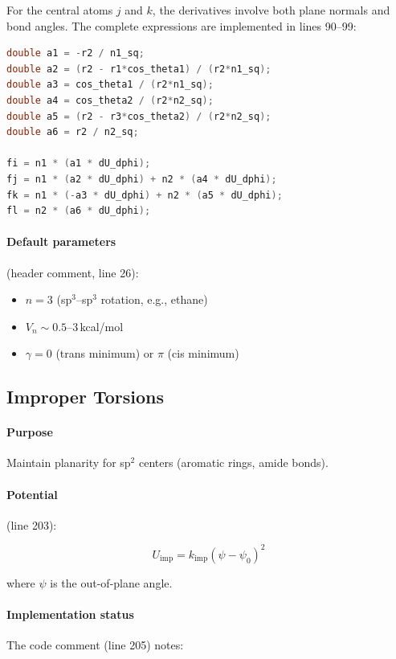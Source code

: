 \documentclass[11pt]{article}
\begin{document}
For the central atoms $j$ and $k$, the derivatives involve both plane normals and bond angles. The complete expressions are implemented in lines 90--99:

\begin{lstlisting}[language=C++]
double a1 = -r2 / n1_sq;
double a2 = (r2 - r1*cos_theta1) / (r2*n1_sq);
double a3 = cos_theta1 / (r2*n1_sq);
double a4 = cos_theta2 / (r2*n2_sq);
double a5 = (r2 - r3*cos_theta2) / (r2*n2_sq);
double a6 = r2 / n2_sq;

fi = n1 * (a1 * dU_dphi);
fj = n1 * (a2 * dU_dphi) + n2 * (a4 * dU_dphi);
fk = n1 * (-a3 * dU_dphi) + n2 * (a5 * dU_dphi);
fl = n2 * (a6 * dU_dphi);
\end{lstlisting}

\paragraph{Default parameters} (header comment, line 26):
\begin{itemize}
\item $n = 3$ (sp$^3$--sp$^3$ rotation, e.g., ethane)
\item $V_n \sim 0.5$--$3$\,kcal/mol
\item $\gamma = 0$ (trans minimum) or $\pi$ (cis minimum)
\end{itemize}

\subsection{Improper Torsions}

\paragraph{Purpose} Maintain planarity for sp$^2$ centers (aromatic rings, amide bonds).

\paragraph{Potential} (line 203):

\begin{equation}
U_{\text{imp}} = k_{\text{imp}}(\psi - \psi_0)^2
\end{equation}

where $\psi$ is the out-of-plane angle.

\paragraph{Implementation status} The code comment (line 205) notes:
\end{document}
